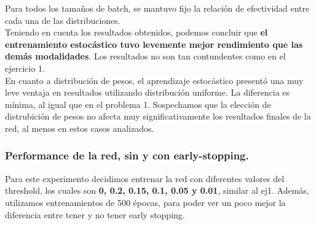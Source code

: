 Para todos los tamaños de batch, se mantuvo fijo la relación de efectividad entre cada una de las distribuciones.\\

Teniendo en cuenta los resultados obtenidos, podemos concluir que \textbf{el entrenamiento estocástico tuvo levemente mejor rendimiento que las demás modalidades}. Los resultados no son tan contundentes como en el ejercicio 1.\\

En cuanto a distribución de pesos, el aprendizaje estocástico presentó una muy leve ventaja en resultados utilizando distribución uniforme. La diferencia es mínima, al igual que en el problema 1. Sospechamos que la elección de distrubición de pesos no afecta muy significativamente los resultados finales de la red, al menos en estos casos analizados.\\

\subsubsection{Performance de la red, sin y con early-stopping.}

Para este experimento decidimos entrenar la red con diferentes valores del threshold, los cuales son \textbf{0, 0.2, 0.15, 0.1, 0.05 y 0.01}, similar 
al ej1. Además, utilizamos entrenamientos de 500 épocas, para poder ver un poco mejor la diferencia entre tener y no tener early stopping.

